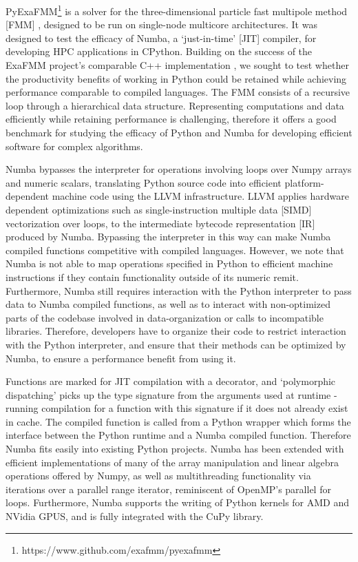 \documentclass{IEEEcsmag}
\begin{document}
PyExaFMM\footnote{https://www.github.com/exafmm/pyexafmm} is a solver for the three-dimensional particle fast multipole method [FMM] \cite{Greengard1987}, designed to be run on single-node multicore architectures. It was designed to test the efficacy of Numba, a `just-in-time' [JIT] compiler, for developing HPC applications in CPython. Building on the success of the ExaFMM project's comparable C++ implementation \cite{Wang2021}, we sought to test whether the productivity benefits of working in Python could be retained while achieving performance comparable to compiled languages.  The FMM consists of a recursive loop through a hierarchical data structure. Representing computations and data efficiently while retaining performance is challenging, therefore it offers a good benchmark for studying the efficacy of Python and Numba for developing efficient software for complex algorithms.

Numba bypasses the interpreter for operations involving loops over Numpy arrays and numeric scalars, translating Python source code into efficient platform-dependent machine code using the LLVM infrastructure. LLVM applies hardware dependent optimizations such as single-instruction multiple data [SIMD] vectorization over loops, to the intermediate bytecode representation [IR] produced by Numba. Bypassing the interpreter in this way can make Numba compiled functions competitive with compiled languages. However, we note that Numba is not able to map operations specified in Python to efficient machine instructions if they contain functionality outside of its numeric remit. Furthermore, Numba still requires interaction with the Python interpreter to pass data to Numba compiled functions, as well as to interact with non-optimized parts of the codebase involved in data-organization or calls to incompatible libraries. Therefore, developers have to organize their code to restrict interaction with the Python interpreter, and ensure that their methods can be optimized by Numba, to ensure a performance benefit from using it.

Functions are marked for JIT compilation with a decorator, and `polymorphic dispatching' picks up the type signature from the arguments used at runtime - running compilation for a function with this signature if it does not already exist in cache. The compiled function is called from a Python wrapper which forms the interface between the Python runtime and a Numba compiled function. Therefore Numba fits easily into existing Python projects. Numba has been extended with efficient implementations of many of the array manipulation and linear algebra operations offered by Numpy, as well as multithreading functionality via iterations over a parallel range iterator, reminiscent of OpenMP's parallel for loops. Furthermore, Numba supports the writing of Python kernels for AMD and NVidia GPUS, and is fully integrated with the CuPy library.
\end{document}
